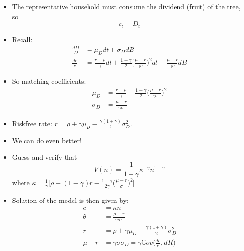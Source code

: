 \documentclass[10pt]{beamer}
\begin{document}
\begin{frame}{}
\begin{itemize}
\item The representative household must consume the dividend (fruit) of the tree, so 
\begin{equation*}
	c_t = D_t
\end{equation*}

\item Recall:
\begin{align*}
	\frac{dD}{D} &= \mu_D dt + \sigma_D dB \\
	\frac{dc}{c} &= \frac{r - \rho}{\gamma} dt + \frac{1+\gamma}{2} \bigg( \frac{\mu - r}{\gamma \sigma} \bigg)^2 dt + \frac{\mu - r}{\gamma \sigma} dB
\end{align*}

\item So matching coefficients: 
\begin{align*}
	\mu_D &= \frac{r - \rho}{\gamma} + \frac{1+\gamma}{2} \bigg( \frac{\mu - r}{\gamma \sigma} \bigg)^2 \\
	\sigma_D &= \frac{\mu - r}{\gamma \sigma}
\end{align*}

\item Riskfree rate: $r = \rho + \gamma \mu_D - \frac{\gamma(1+\gamma)}{2} \sigma_D^2$.
\end{itemize}
\end{frame}


\begin{frame}{}
\begin{itemize}
\item We can do even better!

\item Guess and verify that 
\begin{equation*}
	V(n) = \frac{1}{1-\gamma} \kappa^{-\gamma} n^{1-\gamma}
\end{equation*}
where $\kappa = \frac{1}{\gamma} \Big[ \rho - (1-\gamma)r - \frac{1-\gamma}{2\gamma} \Big( \frac{\mu-r}{\sigma} \Big)^2 \Big]$

\item Solution of the model is then given by:
\begin{align*}
	c &= \kappa n \\
	\theta &= \frac{\mu - r}{\gamma \sigma^2} \\
	r &= \rho + \gamma \mu_D - \frac{\gamma(1+\gamma)}{2} \sigma_D^2 \\
	\mu - r &= \gamma \sigma \sigma_D = \gamma \mathbb Cov \Big( \frac{dc}{c} , dR \Big)
\end{align*}


\end{itemize}
\end{frame}
\end{document}
